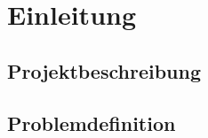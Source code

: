 \chapter{Einleitung}\label{chap:einleit}
\section{Projektbeschreibung}\label{sec:projektbeschreibung}
\section{Problemdefinition}\label{sec:problemdefinition}
